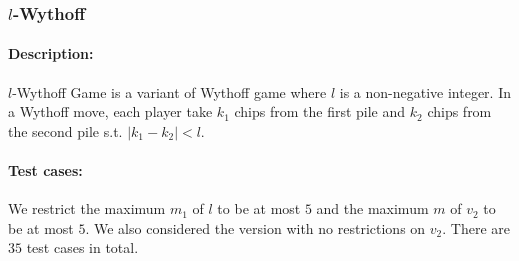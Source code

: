 \documentclass[review]{elsarticle}
\newcommand{\set}[1]{\{ #1 \}}
\newcommand{\tuple}[1]{\langle {#1} \rangle}
\newcommand{\true}{\top}
\newcommand{\statevar}{\mathcal{X}}
\newcommand{\act}{\mathcal{A}}
\newcommand{\constraint}{\mathcal{C}}
\newcommand{\estate}{\mathcal{E}}
\newcommand{\pre}{\mathtt{pre}}
\newcommand{\eff}{\mathtt{eff}}
\newcommand{\modulo}{\equiv}
\begin{document}
%


\subsubsection{$l$-Wythoff \protect\cite{Fra1982}}
\paragraph{Description:} 
$l$-Wythoff Game is a variant of Wythoff game where $l$ is a non-negative integer.
In a Wythoff move, each player take $k_1$ chips from the first pile and $k_2$ chips from the second pile s.t. $|k_1 - k_2| < l$.

\paragraph{Test cases:}
We restrict the maximum $m_1$ of $l$ to be at most $5$ and the maximum $m$ of $v_2$ to be at most $5$.
We also considered the version with no restrictions on $v_2$.
There are $35$ test cases in total.

\end{document}

